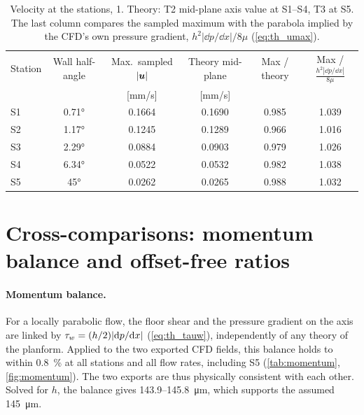 \begin{table}[htbp]
\centering
\caption{Velocity at the stations, \SI{1}{\uLmin}. Theory: T2 mid-plane axis value at S1--S4, T3 at S5. The last column compares the sampled maximum with the parabola implied by the CFD's own pressure gradient, $h^2|\dd p/\dd x|/8\mu$ (\cref{eq:th_umax}).}
\label{tab:velocity}
\small
\begin{tabular}{@{}lccccc@{}}
\toprule
Station & Wall half-angle & Max.\ sampled $|\bm{u}|$ & Theory mid-plane & Max / theory & Max / $\frac{h^2|\dd p/\dd x|}{8\mu}$\\
 & & [mm/s] & [mm/s] & & \\
\midrule
S1 & \ang{0.71} & 0.1664 & 0.1690 & 0.985 & 1.039\\
S2 & \ang{1.17} & 0.1245 & 0.1289 & 0.966 & 1.016\\
S3 & \ang{2.29} & 0.0884 & 0.0903 & 0.979 & 1.026\\
S4 & \ang{6.34} & 0.0522 & 0.0532 & 0.982 & 1.038\\
S5 & \ang{45} & 0.0262 & 0.0265 & 0.988 & 1.032\\
\bottomrule
\end{tabular}
\end{table}

\section{Cross-comparisons: momentum balance and offset-free ratios}
\label{sec:val_cross}

\paragraph{Momentum balance.} For a locally parabolic flow, the floor shear and the pressure gradient on the axis are linked by $\tau_{w}=(h/2)|\mathrm{d} p/\mathrm{d} x|$ (\cref{eq:th_tauw}), independently of any theory of the planform. Applied to the two exported CFD fields, this balance holds to within \SI{0.8}{\percent} at all stations and all flow rates, including S5 (\cref{tab:momentum}, \cref{fig:momentum}). The two exports are thus physically consistent with each other. Solved for $h$, the balance gives 143.9--\SI{145.8}{\micro\metre}, which supports the assumed \SI{145}{\micro\metre}.

